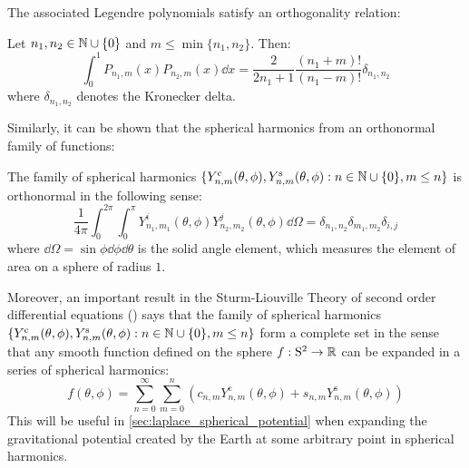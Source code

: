 \documentclass[../main.tex]{subfiles}
\begin{document}
The associated Legendre polynomials satisfy an orthogonality relation:
\begin{lemma}\label{lem:ortho_asso_legendre}
  Let $n_1,n_2\in\mathbb{N}\cup\{0\}$ and $m\leq \min\{n_1,n_2\}$. Then:
  \begin{equation}
    \int_0^1 P_{n_1,m}(x) P_{n_2,m}(x) \dd{x}=\frac{2}{2n_1+1}\frac{(n_1+m)!}{(n_1-m)!} \delta_{n_1,n_2}
  \end{equation}
  where $\delta_{n_1,n_2}$ denotes the Kronecker delta.
\end{lemma}
Similarly, it can be shown that the spherical harmonics from an orthonormal family of functions:
\begin{proposition}
  The family of spherical harmonics $\{Y_{n,m}^{\mathrm{c}}(\theta,\phi),Y_{n,m}^{\mathrm{s}}(\theta,\phi):n\in\mathbb{N}\cup\{0\},m\leq n\}$ is orthonormal in the following sense:
  \begin{equation}\label{eq:ortho_spherical_harmonics}
    \frac{1}{4\pi}\int_0^{2\pi}\int_0^\pi Y_{n_1,m_1}^i(\theta,\phi) Y_{n_2,m_2}^j(\theta,\phi)\dd\Omega=\delta_{n_1,n_2}\delta_{m_1,m_2}\delta_{i,j}
  \end{equation}
  where $\dd\Omega=\sin\phi\dd{\phi}\dd{\theta}$ is the solid angle element, which measures the element of area on a sphere of radius $1$.
\end{proposition}
Moreover, an important result in the Sturm-Liouville Theory of second order differential equations (\cite{wiki:sturmliouville,completenessSL}) says that the family of spherical harmonics $\{Y_{n,m}^{\mathrm{c}}(\theta,\phi),Y_{n,m}^{\mathrm{s}}(\theta,\phi):n\in\mathbb{N}\cup\{0\},m\leq n\}$ form a complete set in the sense that any smooth function defined on the sphere $f:\mathrm{S}^2\rightarrow\mathbb{R}$ can be expanded in a series of spherical harmonics:
\begin{equation}
  f(\theta,\phi)=\sum_{n=0}^\infty\sum_{m=0}^n (c_{n,m} Y_{n,m}^{\mathrm{c}}(\theta,\phi)+s_{n,m} Y_{n,m}^{\mathrm{s}}(\theta,\phi))
\end{equation}
This will be useful in \cref{sec:laplace_spherical_potential} when expanding the gravitational potential created by the Earth at some arbitrary point in spherical harmonics.
\end{document}

